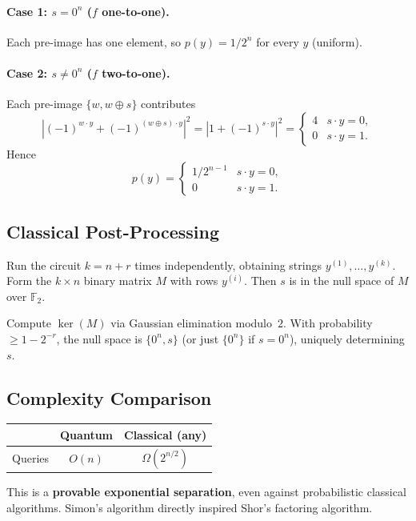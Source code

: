 \documentclass[11pt]{article}
\theoremstyle{definition}
\begin{document}
\paragraph{Case 1: $s=0^n$ ($f$ one-to-one).}
Each pre-image has one element, so $p(y)=1/2^n$ for every $y$ (uniform).

\paragraph{Case 2: $s\neq 0^n$ ($f$ two-to-one).}
Each pre-image $\{w,w\oplus s\}$ contributes
\[
    \left|(-1)^{w\cdot y}+(-1)^{(w\oplus s)\cdot y}\right|^2
    = \left|1+(-1)^{s\cdot y}\right|^2
    = \begin{cases}4 & s\cdot y=0,\\ 0 & s\cdot y=1.\end{cases}
\]
Hence
\[
    p(y) = \begin{cases}1/2^{n-1} & s\cdot y=0,\\ 0 & s\cdot y=1.\end{cases}
\]

\subsection{Classical Post-Processing}

Run the circuit $k=n+r$ times independently, obtaining strings $y^{(1)},\dots,y^{(k)}$.  Form the $k\times n$ binary matrix $M$ with rows $y^{(i)}$.  Then $s$ is in the null space of $M$ over $\mathbb{F}_2$.

Compute $\ker(M)$ via Gaussian elimination modulo~$2$.  With probability $\ge 1-2^{-r}$, the null space is $\{0^n,s\}$ (or just $\{0^n\}$ if $s=0^n$), uniquely determining $s$.

\subsection{Complexity Comparison}

\begin{center}
\begin{tabular}{lcc}
\hline
& \textbf{Quantum} & \textbf{Classical (any)} \\\hline
Queries & $O(n)$ & $\Omega(2^{n/2})$ \\
\hline
\end{tabular}
\end{center}

This is a \textbf{provable exponential separation}, even against probabilistic classical algorithms.  Simon's algorithm directly inspired Shor's factoring algorithm.
\end{document}
